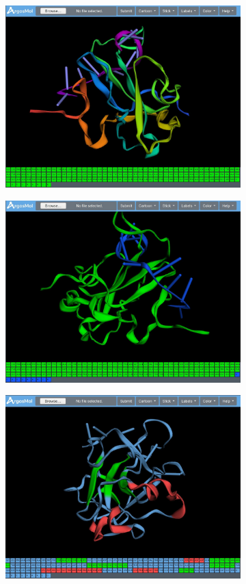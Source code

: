 \documentclass{article}
\begin{document}
\begin{figure}[H]
	\begin{subfigure}{.5\textwidth}
		\centering
		\includegraphics[width=.8\linewidth]{img/argosmol/mol6}
		\caption{}
		\label{fig:sfig1}
	\end{subfigure}%
	\begin{subfigure}{.5\textwidth}
		\centering
		\includegraphics[width=.8\linewidth]{img/argosmol/mol7}
		\caption{}
		\label{fig:sfig2}
	\end{subfigure}
	\begin{subfigure}{.5\textwidth}
		\centering
		\includegraphics[width=.8\linewidth]{img/argosmol/mol8}

\end{subfigure}
\end{figure}
\end{document}
